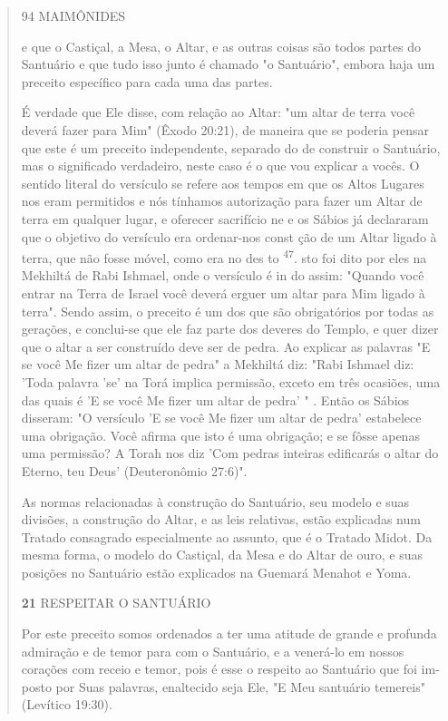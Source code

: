 \begin{quote}
94 MAIMÔNIDES

e que o Castiçal, a Mesa, o Altar, e as outras coisas são todos partes
do Santuário e que tudo isso junto é chamado "o Santuário", embora haja
um preceito espe­cífico para cada uma das partes.

É verdade que Ele disse, com relação ao Altar: "um altar de terra vo­cê
deverá fazer para Mim" (Êxodo 20:21), de maneira que se poderia pensar
que este é um preceito independente, separado do de construir o
Santuário, mas o significado verdadeiro, neste caso é o que vou explicar
a vocês. O senti­do literal do versículo se refere aos tempos em que os
Altos Lugares nos eram permitidos e nós tínhamos autorização para fazer
um Altar de terra em qual­quer lugar, e oferecer sacrifício ne e os
Sábios já declararam que o objetivo do versículo era ordenar-nos const
ção de um Altar ligado à terra, que não fosse móvel, como era no des to
\textsuperscript{47}. sto foi dito por eles na Mekhiltá de Rabi Ishmael,
onde o versículo é in do assim: "Quando você entrar na Terra de Israel
você deverá erguer um altar para Mim ligado à terra". Sendo assim, o
preceito é um dos que são obrigatórios por todas as gerações, e
conclui-se que ele faz parte dos deveres do Templo, e quer dizer que o
altar a ser construí­do deve ser de pedra. Ao explicar as palavras "E se
você Me fizer um altar de pedra" a Mekhiltá diz: "Rabi Ishmael diz:
'Toda palavra 'se' na Torá implica permissão, exceto em três ocasiões,
uma das quais é 'E se você Me fizer um altar de pedra' " . Então os
Sábios disseram: "O versículo 'E se você Me fizer um altar de pedra'
estabelece uma obrigação. Você afirma que isto é uma obri­gação; e se
fôsse apenas uma permissão? A Torah nos diz 'Com pedras inteiras
edificarás o altar do Eterno, teu Deus' (Deuteronômio 27:6)".

As normas relacionadas à construção do Santuário, seu modelo e suas
divisões, a construção do Altar, e as leis relativas, estão explicadas
num Trata­do consagrado especialmente ao assunto, que é o Tratado Midot.
Da mesma forma, o modelo do Castiçal, da Mesa e do Altar de ouro, e suas
posições no Santuário estão explicados na Guemará Menahot e Yoma.

\textbf{21} RESPEITAR O SANTUÁRIO

Por este preceito somos ordenados a ter uma atitude de grande e profunda
admiração e de temor para com o Santuário, e a venerá-lo em nossos
corações com receio e temor, pois é esse o respeito ao Santuário que foi
im­posto por Suas palavras, enaltecido seja Ele, "E Meu santuário
temereis" (Leví­tico 19:30).


\end{quote}

